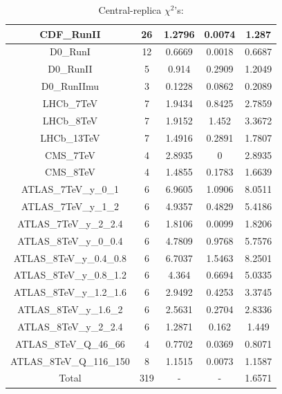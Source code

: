 \documentclass[
]{article}
\begin{document}
\begin{table}[h]
\begin{tabular}{|c|c|c|c|c|}
CDF\_RunII & 26 & 1.2796 & 0.0074 & 1.287 \\ \hline
D0\_RunI & 12 & 0.6669 & 0.0018 & 0.6687 \\ \hline
D0\_RunII & 5 & 0.914 & 0.2909 & 1.2049 \\ \hline
D0\_RunIImu & 3 & 0.1228 & 0.0862 & 0.2089 \\ \hline
LHCb\_7TeV & 7 & 1.9434 & 0.8425 & 2.7859 \\ \hline
LHCb\_8TeV & 7 & 1.9152 & 1.452 & 3.3672 \\ \hline
LHCb\_13TeV & 7 & 1.4916 & 0.2891 & 1.7807 \\ \hline
CMS\_7TeV & 4 & 2.8935 & 0 & 2.8935 \\ \hline
CMS\_8TeV & 4 & 1.4855 & 0.1783 & 1.6639 \\ \hline
ATLAS\_7TeV\_y\_0\_1 & 6 & 6.9605 & 1.0906 & 8.0511 \\ \hline
ATLAS\_7TeV\_y\_1\_2 & 6 & 4.9357 & 0.4829 & 5.4186 \\ \hline
ATLAS\_7TeV\_y\_2\_2.4 & 6 & 1.8106 & 0.0099 & 1.8206 \\ \hline
ATLAS\_8TeV\_y\_0\_0.4 & 6 & 4.7809 & 0.9768 & 5.7576 \\ \hline
ATLAS\_8TeV\_y\_0.4\_0.8 & 6 & 6.7037 & 1.5463 & 8.2501 \\ \hline
ATLAS\_8TeV\_y\_0.8\_1.2 & 6 & 4.364 & 0.6694 & 5.0335 \\ \hline
ATLAS\_8TeV\_y\_1.2\_1.6 & 6 & 2.9492 & 0.4253 & 3.3745 \\ \hline
ATLAS\_8TeV\_y\_1.6\_2 & 6 & 2.5631 & 0.2704 & 2.8336 \\ \hline
ATLAS\_8TeV\_y\_2\_2.4 & 6 & 1.2871 & 0.162 & 1.449 \\ \hline
ATLAS\_8TeV\_Q\_46\_66 & 4 & 0.7702 & 0.0369 & 0.8071 \\ \hline
ATLAS\_8TeV\_Q\_116\_150 & 8 & 1.1515 & 0.0073 & 1.1587 \\ \hline
Total & 319 & - & - & 1.6571 \\ \hline

\end{tabular}

\caption{Central-replica \(\chi^2\)'s:}

\end{table}
\end{document}
